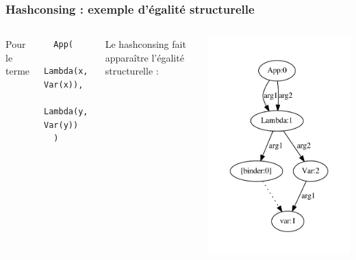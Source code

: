 \begin{frame}[fragile]
\frametitle{Hashconsing : exemple d'égalité structurelle}

\begin{columns}
  Pour le terme 
  \begin{verbatim}
  App(
     Lambda(x, Var(x)), 
     Lambda(y, Var(y))
  )
  \end{verbatim}

  \medskip
  
  Le hashconsing fait apparaître l'égalité structurelle :

    \begin{center}
      \includegraphics[scale=0.6]{pattern/pres_hash.pdf}
    \end{center}

\end{columns}
\end{frame}
